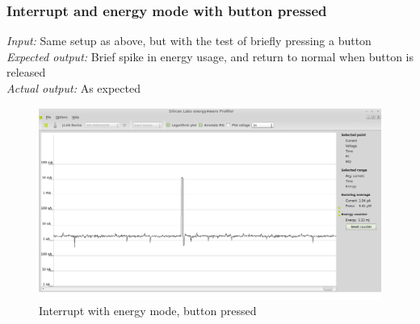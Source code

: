 	\subsubsection{Interrupt and energy mode with button pressed}
	\emph{Input: } Same setup as above, but with the test of briefly pressing a button \\
	\emph{Expected output: } Brief spike in energy usage, and return to normal when button is released \\
	\emph{Actual output: } As expected
	
	\begin{center}
		\begin{figure}[H]
			\includegraphics[width=\textwidth]{fig/interruptAndButton.png}	
			\caption{Interrupt with energy mode, button pressed }	
		\end{figure}
	\end{center}	
	
	



	
		
